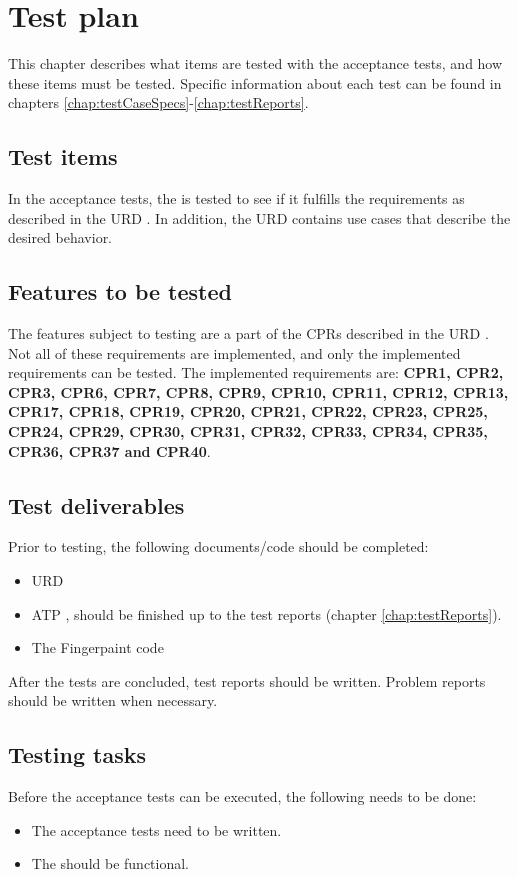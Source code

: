 \chapter{Test plan}
\label{chap:testPlan}
This chapter describes what items are tested with the acceptance tests, and how these items must be tested. Specific information about each test can be found in chapters \ref{chap:testCaseSpecs}-\ref{chap:testReports}.

\section{Test items}
In the acceptance tests, the \applicationname{} is tested to see if it fulfills the requirements as described in the URD \cite{urd}. In addition, the URD \cite{urd} contains use cases that describe the desired behavior.

\section{Features to be tested}
The features subject to testing are a part of the CPRs described in the URD \cite{urd}. Not all of these requirements are implemented, and only the implemented requirements can be tested. The implemented requirements are: \textbf{CPR1, CPR2, CPR3, CPR6, CPR7, CPR8, CPR9, CPR10, CPR11, CPR12, CPR13, CPR17, CPR18, CPR19, CPR20, CPR21, CPR22, CPR23, CPR25, CPR24, CPR29, CPR30, CPR31, CPR32, CPR33, CPR34, CPR35, CPR36, CPR37 and CPR40}.

\section{Test deliverables}
Prior to testing, the following documents/code should be completed:
\begin{itemize}
\item URD \cite{urd}
\item ATP \cite{atp}, should be finished up to the test reports (chapter \ref{chap:testReports}).
\item The Fingerpaint code
\end{itemize}
After the tests are concluded, test reports should be written. Problem reports should be written when necessary.

\section{Testing tasks}
Before the acceptance tests can be executed, the following needs to be done:
\begin{itemize}
\item The acceptance tests need to be written.
\item The \applicationname{} should be functional.
\end{itemize}

